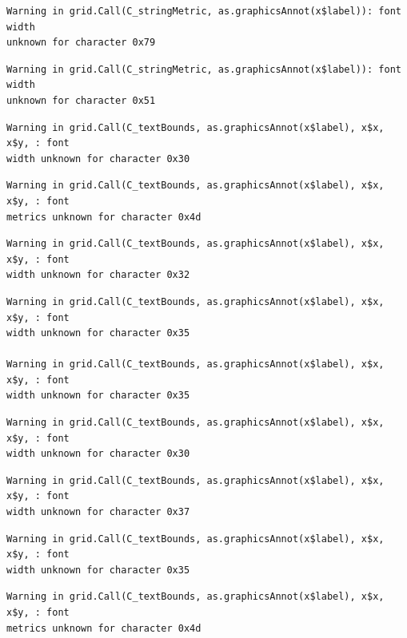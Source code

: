 \documentclass[
  letterpaper,
  DIV=11,
  numbers=noendperiod]{scrreprt}
\begin{document}
\begin{verbatim}
Warning in grid.Call(C_stringMetric, as.graphicsAnnot(x$label)): font width
unknown for character 0x79
\end{verbatim}

\begin{verbatim}
Warning in grid.Call(C_stringMetric, as.graphicsAnnot(x$label)): font width
unknown for character 0x51
\end{verbatim}

\begin{verbatim}
Warning in grid.Call(C_textBounds, as.graphicsAnnot(x$label), x$x, x$y, : font
width unknown for character 0x30
\end{verbatim}

\begin{verbatim}
Warning in grid.Call(C_textBounds, as.graphicsAnnot(x$label), x$x, x$y, : font
metrics unknown for character 0x4d
\end{verbatim}

\begin{verbatim}
Warning in grid.Call(C_textBounds, as.graphicsAnnot(x$label), x$x, x$y, : font
width unknown for character 0x32
\end{verbatim}

\begin{verbatim}
Warning in grid.Call(C_textBounds, as.graphicsAnnot(x$label), x$x, x$y, : font
width unknown for character 0x35

Warning in grid.Call(C_textBounds, as.graphicsAnnot(x$label), x$x, x$y, : font
width unknown for character 0x35
\end{verbatim}

\begin{verbatim}
Warning in grid.Call(C_textBounds, as.graphicsAnnot(x$label), x$x, x$y, : font
width unknown for character 0x30
\end{verbatim}

\begin{verbatim}
Warning in grid.Call(C_textBounds, as.graphicsAnnot(x$label), x$x, x$y, : font
width unknown for character 0x37
\end{verbatim}

\begin{verbatim}
Warning in grid.Call(C_textBounds, as.graphicsAnnot(x$label), x$x, x$y, : font
width unknown for character 0x35
\end{verbatim}

\begin{verbatim}
Warning in grid.Call(C_textBounds, as.graphicsAnnot(x$label), x$x, x$y, : font
metrics unknown for character 0x4d
\end{verbatim}
\end{document}
